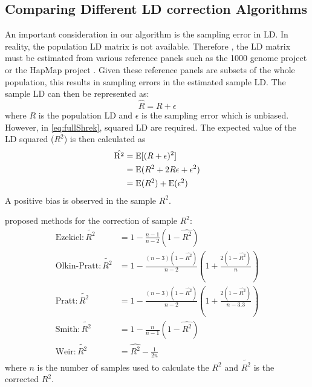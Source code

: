 	\subsection{Comparing Different LD correction Algorithms}
		\label{sec:ldSim}
		An important consideration in our algorithm is the sampling error in \gls{LD}.
		In reality, the population \gls{LD} matrix is not available.
		Therefore , the \gls{LD} matrix must be estimated from various reference panels such as the 1000 genome project \citep{Project2012} or the HapMap project \citep{Altshuler2010}.
		Given these reference panels are subsets of the whole population, this results in sampling errors in the estimated sample \gls{LD}.
		The sample \gls{LD} can then be represented as:
		$$
		\hat{R} = R+\epsilon
		$$
		where $R$ is the population \gls{LD} and $\epsilon$ is the sampling error which is unbiased.
		However, in \cref{eq:fullShrek}, squared \gls{LD} are required.
		The expected value of the \gls{LD} squared ($R^2$) is then calculated as
		\begin{align}
		\mathrm{\hat{R^2}} &= \mathrm{E}[(R+\epsilon)^2] \notag\\
		&=\mathrm{E}(R^2+2R\epsilon+\epsilon^2) \notag\\
		&=\mathrm{E}(R^2)+\mathrm{E}(\epsilon^2)
		\end{align}
		A positive bias is observed in the sample $R^2$.
		
		\citet{Weir1980,Wang2007} proposed methods for the correction of sample $R^2$:
		\begin{align}
		\text{Ezekiel}: \tilde{R^2}&= 1-\frac{n-1}{n-2}(1-\hat{R^2})\label{eq:ezekiel} \\
		\text{Olkin-Pratt}: \tilde{R^2}&=1-\frac{(n-3)(1-\hat{R^2})}{n-2}(1+\frac{2(1-\hat{R^2})}{n})\label{eq:okin} \\
		\text{Pratt}: \tilde{R^2}&=1-\frac{(n-3)(1-\hat{R^2})}{n-2}(1+\frac{2(1-\hat{R^2})}{n-3.3})\label{eq:pratt} \\
		\text{Smith}: \tilde{R^2}&=1-\frac{n}{n-1}(1-\hat{R^2}) \label{eq:smith}\\
		\text{Weir}: \tilde{R^2}&=\hat{R^2}-\frac{1}{2n} \label{eq:weir}
		\end{align}
		where $n$ is the number of samples used to calculate the $R^2$ and $\tilde{R^2}$ is the corrected $R^2$.
		
